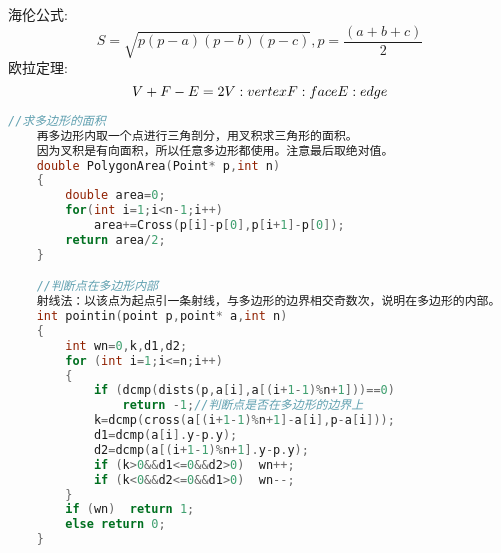 \documentclass[]{article}
\begin{document}
海伦公式:
$$
S = \sqrt{p(p - a)(p - b)(p - c)}, p = \frac{(a + b + c)}{2}
$$
欧拉定理:
$$
V+F-E=2  \\  
V:vertex  \\  
F:face  \\  
E:edge  \\  
$$
\begin{lstlisting}[language={c}]
    //求多边形的面积
    再多边形内取一个点进行三角剖分，用叉积求三角形的面积。
    因为叉积是有向面积，所以任意多边形都使用。注意最后取绝对值。
    double PolygonArea(Point* p,int n)
    {
        double area=0;
        for(int i=1;i<n-1;i++)
            area+=Cross(p[i]-p[0],p[i+1]-p[0]);
        return area/2;
    }

    //判断点在多边形内部
    射线法：以该点为起点引一条射线，与多边形的边界相交奇数次，说明在多边形的内部。
    int pointin(point p,point* a,int n)   
    {  
        int wn=0,k,d1,d2;  
        for (int i=1;i<=n;i++)  
        {  
            if (dcmp(dists(p,a[i],a[(i+1-1)%n+1]))==0)
                return -1;//判断点是否在多边形的边界上   
            k=dcmp(cross(a[(i+1-1)%n+1]-a[i],p-a[i]));  
            d1=dcmp(a[i].y-p.y);  
            d2=dcmp(a[(i+1-1)%n+1].y-p.y);  
            if (k>0&&d1<=0&&d2>0)  wn++;  
            if (k<0&&d2<=0&&d1>0)  wn--;  
        }  
        if (wn)  return 1;  
        else return 0;  
    }
\end{lstlisting}
\end{document}
